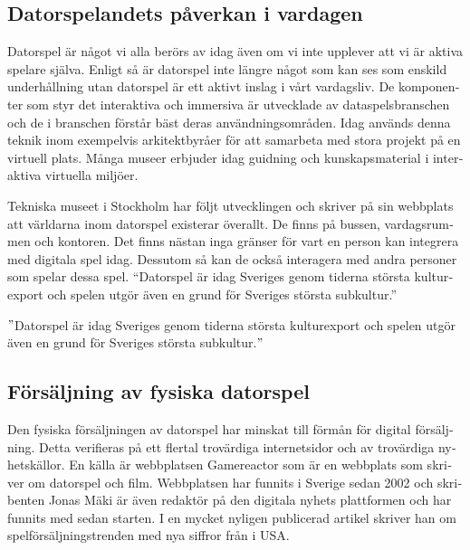 \documentclass[11p]{article}
\begin{document}
\begin{otherlanguage}{swedish}
        \setlength{\leftskip}{0cm}

        \subsection{Datorspelandets påverkan i vardagen}

    Datorspel är något vi alla berörs av idag även om vi inte upplever att vi är aktiva spelare själva.
    Enligt \textcite{Riksdag} så är datorspel inte längre något som kan ses som enskild underhållning utan datorspel är ett aktivt inslag i vårt vardagsliv.
    De komponenter som styr det interaktiva och immersiva är utvecklade av dataspelsbranschen och de i branschen förstår bäst deras användningsområden.
    Idag används denna teknik inom exempelvis arkitektbyråer för att samarbeta med stora projekt på en virtuell plats.
    Många museer erbjuder idag guidning och kunskapsmaterial i interaktiva virtuella miljöer.

    Tekniska museet \parencite{worlds} i Stockholm har följt utvecklingen och skriver på sin webbplats att världarna inom datorspel existerar överallt.
    De finns på bussen, vardagsrummen och kontoren.
    Det finns nästan inga gränser för vart en person kan integrera med digitala spel idag.
    Dessutom så kan de också interagera med andra personer som spelar dessa spel.
    “Datorspel är idag Sveriges genom tiderna största kulturexport och spelen utgör även en grund för Sveriges största subkultur.”

    \setlength{\leftskip}{1cm}
        \("\)Datorspel är idag Sveriges genom tiderna största kulturexport och spelen utgör även en grund för Sveriges största subkultur.\("\)

        \setlength{\leftskip}{0cm}


        \subsection{Försäljning av fysiska datorspel}
        Den fysiska försäljningen av datorspel har minskat till förmån för digital försäljning.
        Detta verifieras på ett flertal trovärdiga internetsidor och av trovärdiga nyhetskällor.
        En källa är webbplatsen Gamereactor som är en webbplats som skriver om datorspel och film.
        Webbplatsen har funnits i Sverige sedan 2002 och skribenten Jonas Mäki är även redaktör på den digitala nyhets plattformen och har funnits med sedan starten.
        I en mycket nyligen publicerad artikel skriver han om spelförsäljningstrenden med nya siffror från i USA.


\end{otherlanguage}
\end{document}
